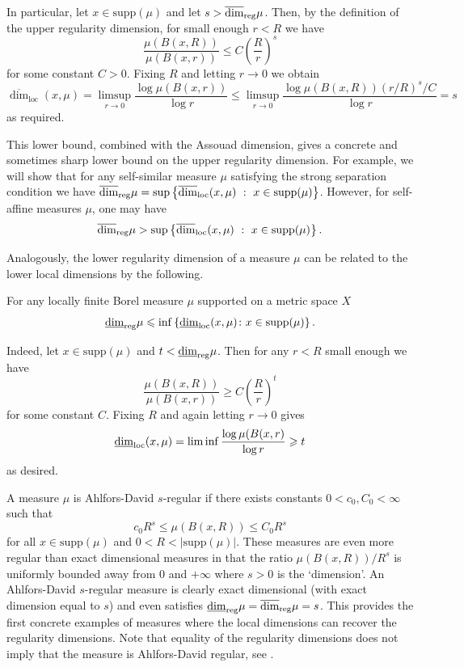 In particular, let $x \in \text{supp}(\mu)$ and let $s > \overline{\dim}_{\textup{reg}} \mu$.  Then, by the definition of the upper regularity dimension, for small enough $r < R$ we have
\[
\frac{\mu(B(x,R))}{\mu(B(x,r))} \leq C\left(\frac{R}{r}\right)^{s}
\]
for some constant $C>0$.  Fixing $R$ and letting $r \to 0$ we obtain
\[
\overline{\dim}_{\text{loc}}(x,\mu)=\limsup_{r\rightarrow 0} \frac{\log \mu(B(x,r))}{\log r} \leq  \limsup_{r\rightarrow 0} \frac{\log \mu(B(x,R)) (r/R)^s/C }{\log r}  = s
\]
as required. 

This lower bound, combined with the Assouad dimension, gives a concrete and sometimes sharp lower bound on the upper regularity dimension. For example, we will show that for any self-similar measure $\mu$ satisfying the strong separation condition we have $ \overline{\dim}_{\textup{reg}} \mu = \sup \left\{ \overline{\dim}_{\text{loc}}(x,\mu) \ : \  x\in \text{supp}(\mu) \right\}$.  However, for self-affine measures $\mu$, one may have
\[
\overline{\dim}_{\textup{reg}} \mu >  \sup \left\{ \overline{\dim}_{\text{loc}}(x,\mu) \ : \  x\in \text{supp}(\mu) \right\}.
\]

Analogously, the lower regularity dimension of a measure $\mu$ can be related to the lower local dimensions by the following.
\begin{lemma}
For any locally finite Borel measure $\mu$ supported on a metric space $X$
\[
\underline{\dim}_{\textup{reg}} \mu \leqslant \inf \left\{\underline{\dim}_{\textup{loc}}(x,\mu) \colon x \in \text{supp}(\mu) \right\}.
\]
\end{lemma}
Indeed, let $x\in \text{supp}(\mu)$ and $t < \underline{\dim}_{\textup{reg}} \mu$. Then for any $r < R$ small enough we have
\[
\frac{\mu(B(x,R))}{\mu(B(x,r))} \geq C\left(\frac{R}{r}\right)^{t}
\]
for some constant $C$. Fixing $R$ and again letting $r \rightarrow 0$ gives
\[
\underline{\dim}_{\textup{loc}}(x,\mu) = \liminf \frac{\log \mu(B(x,r)}{\log r} \geqslant t
\]
as desired.

A measure $\mu$ is Ahlfors-David $s$-regular if there exists constants $0<c_0,C_0< \infty$ such that 
\[
c_0 R^s \le \mu(B(x,R)) \le C_0 R^s
\]
for all $x\in \text{supp}(\mu)$ and $0 < R < \lvert \text{supp}(\mu) \rvert$.
These measures are even more regular than exact dimensional measures in that the ratio $\mu(B(x,R))/R^s$ is uniformly bounded away from 0 and $+\infty$ where $s >0$ is the `dimension'.  An Ahlfors-David $s$-regular measure is clearly exact dimensional (with exact dimension equal to $s$) and even satisfies $\underline{\dim}_{\textup{reg}} \mu = \overline{\dim}_{\textup{reg}} \mu = s$. This provides the first concrete examples of measures where the local dimensions can recover the regularity dimensions. Note that equality of the regularity dimensions does not imply that the measure is Ahlfors-David regular, see \cite{hare-troscheit}.




